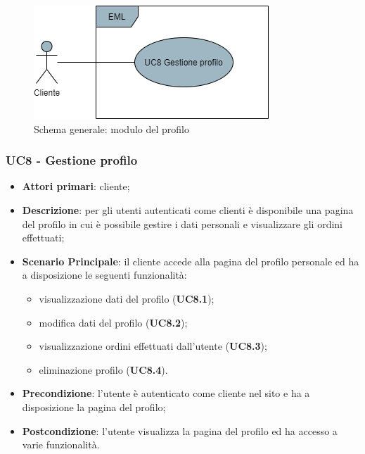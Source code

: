 \begin{figure}[H]
\centering
\includegraphics[scale=0.6]{res/UseCase/Immagini/ProfiloGenerale}
\caption{Schema generale: modulo del profilo}
\end{figure}

\subsubsection{UC8 - Gestione profilo}
\begin{itemize}
\item \textbf{Attori primari}: cliente;
\item \textbf{Descrizione}: per gli utenti autenticati come clienti è disponibile una pagina del profilo in cui è possibile gestire i dati personali e visualizzare gli ordini effettuati;
\item \textbf{Scenario Principale}: il cliente accede alla pagina del profilo personale ed ha a disposizione le seguenti funzionalità:
\begin{itemize}
\item visualizzazione dati del profilo (\textbf{UC8.1});
\item modifica dati del profilo (\textbf{UC8.2});
\item visualizzazione ordini effettuati dall'utente (\textbf{UC8.3});
\item eliminazione profilo (\textbf{UC8.4}).
\end{itemize}
\item \textbf{Precondizione}: l'utente è autenticato come cliente nel sito e ha a disposizione la pagina del profilo;
\item \textbf{Postcondizione}: l'utente visualizza la pagina del profilo ed ha accesso a varie funzionalità.
\end{itemize}

